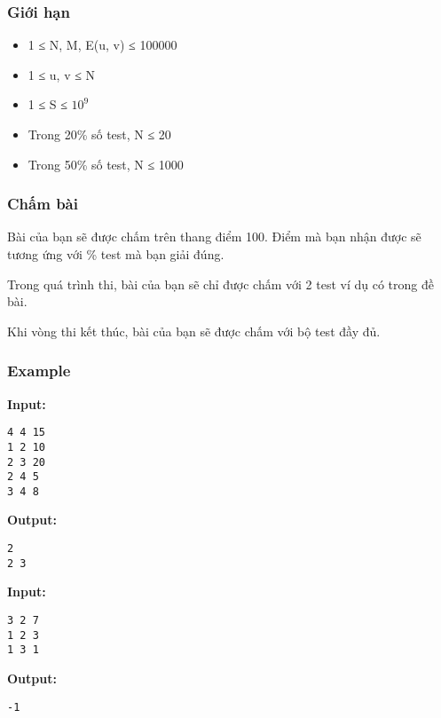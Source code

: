 \subsubsection{Giới hạn}
\begin{itemize}
	\item 1 ≤ N, M, E(u, v) ≤ 100000
	\item 1 ≤ u, v ≤ N
	\item 1 ≤ S ≤ $10^{9}$
	\item Trong 20\% số test, N ≤ 20
	\item Trong 50\% số test, N ≤ 1000
\end{itemize}

\subsubsection{Chấm bài}

Bài của bạn sẽ được chấm trên thang điểm 100. Điểm mà bạn nhận được sẽ tương ứng với \% test mà bạn giải đúng.

Trong quá trình thi, bài của bạn sẽ chỉ được chấm với 2 test ví dụ có trong đề bài.

Khi vòng thi kết thúc, bài của bạn sẽ được chấm với bộ test đầy đủ.

\subsubsection{Example}

\textbf{Input: }
\begin{verbatim}
4 4 15
1 2 10
2 3 20
2 4 5
3 4 8
\end{verbatim}

\textbf{Output: }
\begin{verbatim}
2
2 3 
\end{verbatim}

\textbf{Input: }
\begin{verbatim}
3 2 7
1 2 3
1 3 1
\end{verbatim}

\textbf{Output: }
\begin{verbatim}
-1 \end{verbatim}
